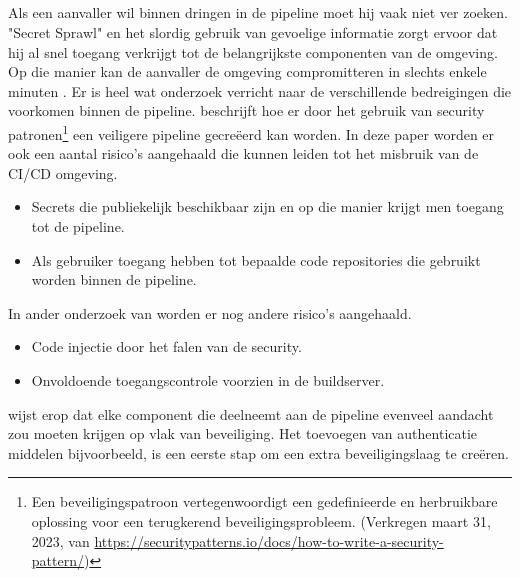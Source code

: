 \subsection{}
\label{sec:Bedreigingen in de pipeline}
Als een aanvaller wil binnen dringen in de pipeline moet hij vaak niet ver zoeken. "Secret Sprawl" en het slordig gebruik van gevoelige informatie zorgt ervoor dat hij al snel toegang verkrijgt tot de belangrijkste componenten van de omgeving. Op die manier kan de aanvaller de omgeving compromitteren in slechts enkele minuten \autocite{Smart2022}. Er is heel wat onderzoek verricht naar de verschillende bedreigingen die voorkomen binnen de pipeline. \textcite{Rimba2015} beschrijft hoe er door het gebruik van security patronen\footnote{Een beveiligingspatroon vertegenwoordigt een gedefinieerde en herbruikbare oplossing voor een terugkerend beveiligingsprobleem. (Verkregen maart 31, 2023, van \url{https://securitypatterns.io/docs/how-to-write-a-security-pattern/})} een veiligere pipeline gecreëerd kan worden. In deze paper worden er ook een aantal risico’s aangehaald die kunnen leiden tot het misbruik van de CI/CD omgeving.
 
\begin{itemize}
  \item Secrets die publiekelijk beschikbaar zijn en op die manier krijgt men toegang tot de pipeline.
  \item Als gebruiker toegang hebben tot bepaalde code repositories die gebruikt worden binnen de pipeline.
\end{itemize}

In ander onderzoek van \textcite{Ullah2017} worden er nog andere risico's aangehaald.

\begin{itemize}
  \item Code injectie door het falen van de security.
  \item Onvoldoende toegangscontrole voorzien in de buildserver.
\end{itemize}

\textcite{Ullah2017} wijst erop dat elke component die deelneemt aan de pipeline evenveel aandacht zou moeten krijgen op vlak van beveiliging. Het toevoegen van authenticatie middelen bijvoorbeeld, is een eerste stap om een extra beveiligingslaag te creëren.
\newline

